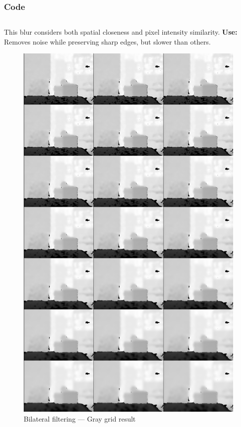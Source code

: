 \documentclass[a4paper,11pt]{article}
\begin{document}
	\subsubsection*{Code}
	\inputminted{python}{Python_Files/07_bilateral_blur.py}
	
	This blur considers both spatial closeness and pixel intensity similarity.  
	\textbf{Use:} Removes noise while preserving sharp edges, but slower than others.

	\begin{figure}[H]
		\centering
		\includegraphics[width=\textwidth,height=0.9\textheight,keepaspectratio]{Images/blur/07_bilateral_gray_grid.png}
		\caption{Bilateral filtering — Gray grid result}
	\end{figure}
	\clearpage
	
\end{document}
